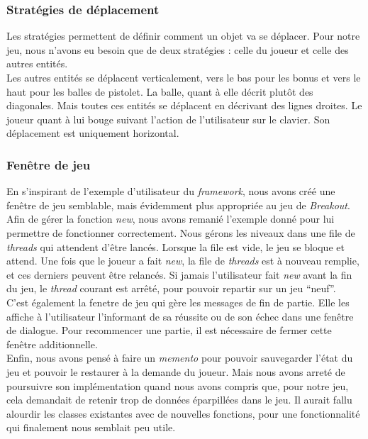 \documentclass[a4paper,10pt]{article}
\begin{document}
    \subsubsection{Stratégies de déplacement}
        Les stratégies permettent de définir comment un objet va se déplacer. Pour notre jeu, nous n'avons eu besoin
        que de deux stratégies  : celle du joueur et celle des autres entités. \\ Les autres entités
        se déplacent verticalement, vers le bas pour les bonus et vers le haut pour les balles de pistolet. La balle, quant
        à elle décrit plutôt des diagonales. Mais toutes ces entités se déplacent en décrivant des lignes droites.
        Le joueur quant à lui bouge suivant l'action de l'utilisateur sur le clavier. Son déplacement est uniquement horizontal.

    \subsubsection{Fenêtre de jeu}
        En s'inspirant de l'exemple d'utilisateur du \textit{framework}, nous avons créé une fenêtre de jeu semblable,
        mais évidemment plus appropriée au jeu de \textit{Breakout}. \\

        Afin de gérer la fonction \textit{new}, nous avons remanié l'exemple donné pour lui permettre de fonctionner
        correctement. Nous gérons les niveaux dans une file de \textit{threads} qui attendent d'être lancés. Lorsque la file
        est vide, le jeu se bloque et attend. Une fois que le joueur a fait \textit{new}, la file de \textit{threads} est
        à nouveau remplie, et ces derniers peuvent être relancés. Si jamais l'utilisateur fait \textit{new} avant
        la fin du jeu, le \textit{thread} courant est arrêté, pour pouvoir repartir sur un jeu ``neuf''. \\

        C'est également la fenetre de jeu qui gère les messages de fin de partie. Elle les affiche à l'utilisateur
        l'informant de sa réussite ou de son échec dans une fenêtre de dialogue. Pour recommencer une partie, il
        est nécessaire de fermer cette fenêtre additionnelle. \\

        Enfin, nous avons pensé à faire un \textit{memento} pour pouvoir sauvegarder l'état du jeu et pouvoir le
        restaurer à la demande du joueur. Mais nous avons arreté de poursuivre son implémentation quand nous avons
        compris que, pour notre jeu, cela demandait de retenir trop de données éparpillées dans le jeu. Il aurait
        fallu alourdir les classes existantes avec de nouvelles fonctions, pour une fonctionnalité qui finalement
        nous semblait peu utile.
\end{document}
